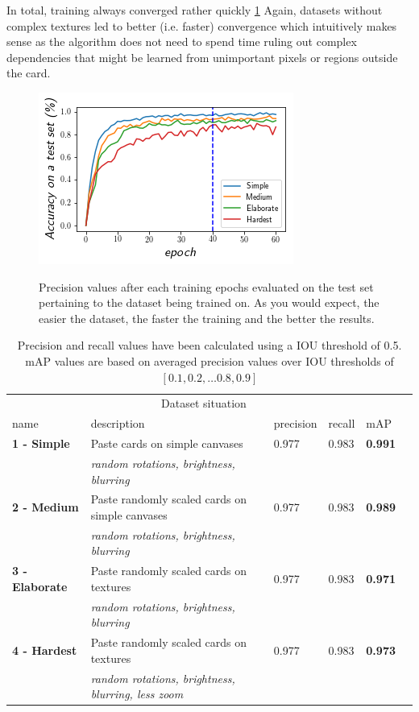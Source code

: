 \documentclass[a4paper]{article}
\begin{document}
In total, training always converged rather quickly \ref{fig:curve} Again, datasets without complex textures led to better (i.e. faster) convergence which intuitively makes sense as the algorithm does not need to spend time ruling out complex dependencies that might be learned from unimportant pixels or regions outside the card.\\
\begin{figure}

\includegraphics[scale=1]{images/loss}
\label{fig:curve}
\caption{Precision values after each training epochs evaluated on the test set pertaining to the dataset being trained on. As you would expect, the easier the dataset, the faster the training and the better the results. }


\end{figure}
\begin{table}[h]


\begin{tabular}{lllllr}
\hline
\multicolumn{5}{c}{Dataset situation} \\
\cline{1-2}
name    & description  & precision & recall & mAP \\
\hline
\textbf{1 - Simple}      & Paste cards on simple canvases    &  0.977  & 0.983 & \textbf{0.991} \\
          & \textit{random rotations, brightness, blurring}     & & & \\
\textbf{2 - Medium}      & Paste randomly scaled cards on simple canvases & 0.977 & 0.983 & \textbf{0.989} \\
          & \textit{random rotations, brightness, blurring}     & & & \\
\textbf{3 - Elaborate}       & Paste randomly scaled cards on textures & 0.977 & 0.983 & \textbf{0.971} \\
          & \textit{random rotations, brightness, blurring}     & & & \\
\textbf{4 - Hardest} & Paste randomly scaled cards on textures & 0.977 & 0.983 & \textbf{0.973} \\
          & \textit{random rotations, brightness, blurring, less zoom}     & & & \\
\hline


\end{tabular}
\caption{Precision and recall values have been calculated using a IOU threshold of 0.5. mAP values are based on averaged precision values over IOU thresholds of $[0.1, 0.2, \dots 0.8, 0.9] $  }
\label{tab:res}
\end{table}
\end{document}
